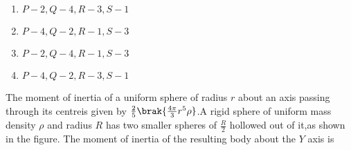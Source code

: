     \begin{enumerate}
        \item $P-2,Q-4,R-3,S-1$
        \item $P-4,Q-2,R-1,S-3$
        \item $P-2,Q-4,R-1,S-3$
        \item $P-4,Q-2,R-3,S-1$
     \end{enumerate}
     \item The moment of inertia of a uniform sphere of radius $r$ about an axis passing through its centreis given by $\frac{2}{5}\brak{\frac{4\pi}{3}r^5\rho}$.A rigid sphere of uniform mass density $\rho$ and radius $R$ has two smaller spheres of $\frac{R}{2}$ hollowed out of it,as shown in the figure. The moment of inertia of the resulting body about the $Y$ axis is

